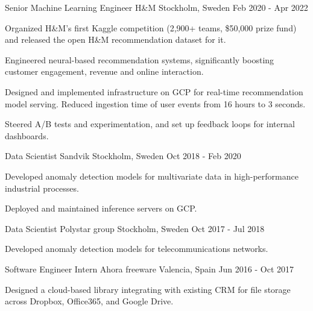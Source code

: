 \begin{cventries}
\cventry
    {Senior Machine Learning Engineer}
    {H\&M}
    {Stockholm, Sweden}
    {Feb 2020 - Apr 2022}
    {
      \begin{cvitems} %
        \item {Organized H\&M's first Kaggle competition (2,900+ teams, \$50,000 prize fund) and released the open H\&M recommendation dataset for it.}
        \item {Engineered neural-based recommendation systems, significantly boosting customer engagement, revenue and online interaction.}
        \item {Designed and implemented infrastructure on GCP for real-time recommendation model serving. Reduced ingestion time of user events from 16 hours to 3 seconds.}
        \item {Steered A/B tests and experimentation, and set up feedback loops for internal dashboards.}
        \end{cvitems}
    }

\cventry
    {Data Scientist}
    {Sandvik}
    {Stockholm, Sweden}
    {Oct 2018 - Feb 2020}
    {
        \begin{cvitems}
            \item {Developed anomaly detection models for multivariate data in high-performance industrial processes.}
            \item {Deployed and maintained inference servers on GCP.}
        \end{cvitems}
    }

\cventry
    {Data Scientist}
    {Polystar group}
    {Stockholm, Sweden}
    {Oct 2017 - Jul 2018}
    {
        \begin{cvitems}
            \item {Developed anomaly detection models for telecommunications networks.}
        \end{cvitems}
    }

\cventry
    {Software Engineer Intern}
    {Ahora freeware}
    {Valencia, Spain}
    {Jun 2016 - Oct 2017}
    {
        \begin{cvitems}
            \item {Designed a cloud-based library integrating with existing CRM for file storage across Dropbox, Office365, and Google Drive.}
        \end{cvitems}
    }


\end{cventries}
